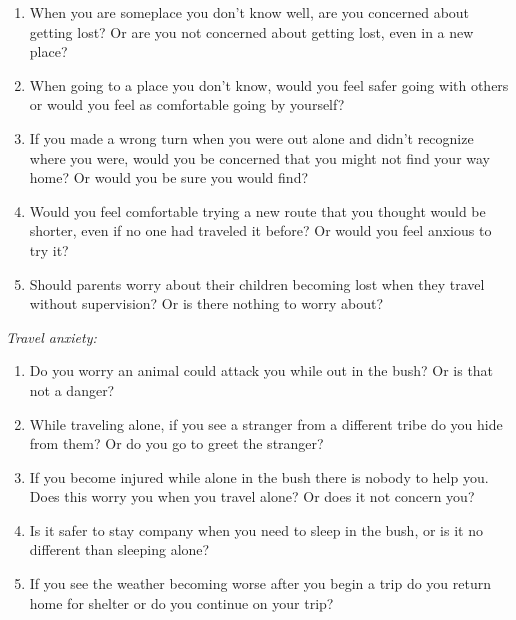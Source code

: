 \documentclass{article}
\begin{document}
\begin{enumerate}

\item When you are someplace you don't know well, are you concerned about getting lost?  Or are you not concerned about getting lost, even in a new place?

\item When going to a place you don't know, would you feel safer going with others or would you feel as comfortable going by yourself?

\item If you made a wrong turn when you were out alone and didn't recognize where you were, would you be concerned that you might not find your way home?  Or would you be sure you would find?

\item Would you feel comfortable trying a new route that you thought would be shorter, even if no one had traveled it before? Or would you feel anxious to try it?

\item Should parents worry about their children becoming lost when they travel without supervision? Or is there nothing to worry about?

\end{enumerate}

\emph{Travel anxiety:}

\begin{enumerate}

\item Do you worry an animal could attack you while out in the bush? Or is that not a danger?

\item While traveling alone, if you see a stranger from a different tribe do you hide from them? Or do you go to greet the stranger?

\item If you become injured while alone in the bush there is nobody to help you. Does this worry you when you travel alone? Or does it not concern you?

\item  Is it safer to stay company when you need to sleep in the bush, or is it no different than sleeping alone?

\item If you see the weather becoming worse after you begin a trip do you return home for shelter or do you continue on your trip?

\end{enumerate}
\end{document}
